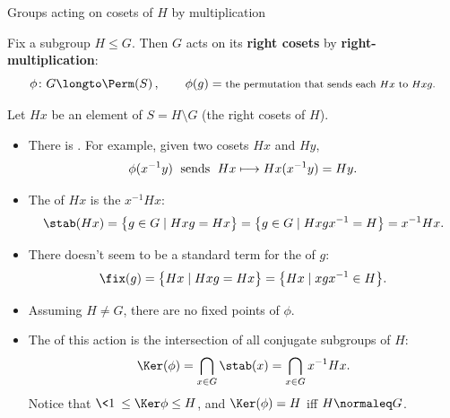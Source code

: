 \documentclass[8pt, handout]{beamer}
\newcommand{\Pause}{}      %
\begin{document}

\begin{frame}{Groups acting on cosets of $H$ by multiplication} %
  
  Fix a subgroup $H\leq G$. Then $G$ acts on its \textbf{right cosets}
  by \textbf{right-multiplication}:
  \[
  \phi\colon G\longto\Perm(S)\,,\qquad
  \phi(g)=\mbox{\footnotesize the permutation that sends each $Hx$ to
    $Hxg$.}
  \]
  
  \Pause
  
  Let $Hx$ be an element of $S=H\!\setminus\!G$ (the right cosets of
  $H$). \Pause
  \begin{itemize}
  \item There is . \Pause For example, given two cosets
    $Hx$ and $Hy$,
    \[
    \text{$\phi(x^{-1}y)$\; sends\; $Hx\longmapsto Hx(x^{-1}y)=Hy$}.
    \]   
    \vspace{-4mm}\Pause
  \item The  of $Hx$ is the
     $x^{-1}Hx$: 
    \[
    \stab(Hx)=\big\{g\in G\mid Hxg=Hx\big\}\Pause=\big\{g\in G\mid
    Hxgx^{-1}=H\big\} \Pause=x^{-1}Hx.
    \]
    \vspace{-4mm}\Pause    
  \item There doesn't seem to be a standard term for the
     of $g$:
    \[
    \fix(g)=\big\{Hx\mid Hxg=Hx\big\}=\big\{Hx\mid xgx^{-1}\in H\big\}.
    \]
    \vspace{-4mm}\Pause
  \item Assuming $H\neq G$, there are {\color{xGreen}no fixed
    points} of $\phi$. 

    \smallskip\Pause
    
  \item The  of this action is the intersection of all
    conjugate subgroups of $H$:
    \[
    \Ker(\phi)=\bigcap_{x\in G}\stab(x)=\bigcap_{x\in G}x^{-1}Hx.
    \]
    \Pause Notice that $\<1\>\leq\Ker\phi\leq H$, and $\Ker(\phi)=H$ iff
    $H\normaleq G$.
  \end{itemize}
  
\end{frame}

\end{document}
